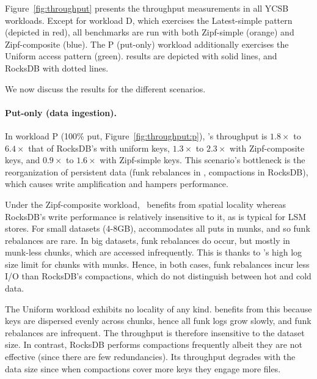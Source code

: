 Figure~\ref{fig:throughput} presents the throughput measurements in all YCSB workloads. 
Except for workload D, which exercises the Latest-simple pattern
(depicted in red), all benchmarks are run with both  Zipf-simple (orange) 
and Zipf-composite (blue). The P (put-only) workload 
additionally exercises the Uniform access pattern (green). \sys\/ results are depicted with solid
lines, and RocksDB with dotted lines. 

We now discuss the results for the different scenarios.
  
\paragraph{Put-only (data ingestion).} In workload {P} (100\% put, Figure~\ref{fig:throughput:p}), 
\sys's throughput is $1.8\times$ to $6.4\times$ that of RocksDB's with uniform keys, $1.3\times$ to $2.3\times$ with Zipf-composite keys, 
and $0.9\times$ to $1.6\times$ with Zipf-simple keys. This scenario's bottleneck is the reorganization of persistent data  
(funk rebalances in \sys, compactions in RocksDB), which causes write amplification and hampers performance. 
 
 Under the Zipf-composite workload, \sys\ benefits from spatial locality whereas RocksDB's write performance 
 is relatively insensitive to it, as is typical for LSM stores. For small datasets (4-8GB), \sys\/ accommodates 
all puts in munks, and so funk rebalances are rare. In big datasets, funk rebalances do occur, but mostly in 
munk-less chunks, which are accessed infrequently. This is thanks to \sys\/'s high log size limit for chunks 
with munks. Hence, in both cases, funk rebalances incur less I/O than RocksDB's compactions, 
which do not distinguish between hot and cold data. 

 
The Uniform workload exhibits no locality of any kind. 
 \sys\/ benefits from this because keys are dispersed evenly across chunks, hence all funk logs grow 
 slowly, and funk rebalances are infrequent. The throughput is therefore insensitive to the dataset 
 size. In contrast, RocksDB performs compactions frequently albeit they are not effective (since there are few redundancies). Its throughput 
 degrades  with the data size since when compactions cover more keys they engage more files.
 
